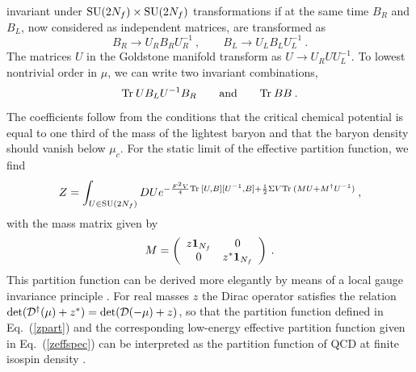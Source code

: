 invariant under ${\rm SU}(2N_f)\times{\rm SU}(2N_f)$ transformations
if at the same time $B_R$ and $B_L$, now considered as independent
matrices, are transformed as
\begin{equation}
  B_R \rightarrow  U_R B_R U_R^{-1} \:, \qquad B_L \rightarrow U_L B_L
  U_L^{-1}\:. 
\end{equation}
The matrices $U$ in the Goldstone manifold transform as $U \to U_R U
U_L^{-1}$. 
To lowest nontrivial order in $\mu$, we can write two invariant
combinations,
\begin{equation}
  {\rm Tr\:} U B_L U^{-1} B_R \qquad {\rm and} \qquad {\rm Tr\:} BB\:.
\end{equation}
The coefficients follow from the conditions that the critical chemical
potential is equal to one third of the mass of the lightest baryon and
that the baryon density should vanish below $\mu_c$.  For the static
limit of the effective partition function, we find
\begin{equation}
  Z = \int_{U\in {\rm SU}(2N_f)} DU e^{-\frac {F^2 V}4{\rm Tr\:}[ U, B]
    [ U^{-1}, B] + \frac12\Sigma V {\rm Tr\:} (MU + M^\dagger U^{-1})}\:,
\label{zeffspec}
\end{equation}
with the mass matrix given by
\begin{equation}
  M = \left ( \begin{array}{cc} z {\bf 1}_{N_f} & 0 \\ 0 & z^* {\bf 1}_{N_f} \end{array} \right )\:.
\end{equation}
This partition function can be derived more elegantly by means of 
a local gauge invariance principle \cite{KST,KSTVZ}.
For real masses $z$ the Dirac operator
satisfies the relation 
${\rm det}({\cal D}^\dagger(\mu) + z^*)=
{\rm det}({\cal D}(-\mu) + z)$, so that the partition function 
defined in Eq.~(\ref{zpart}) and the corresponding low-energy effective
partition function given in Eq.~(\ref{zeffspec}) can  be
interpreted as the partition function of QCD at finite isospin density
\cite{misha-son}.

